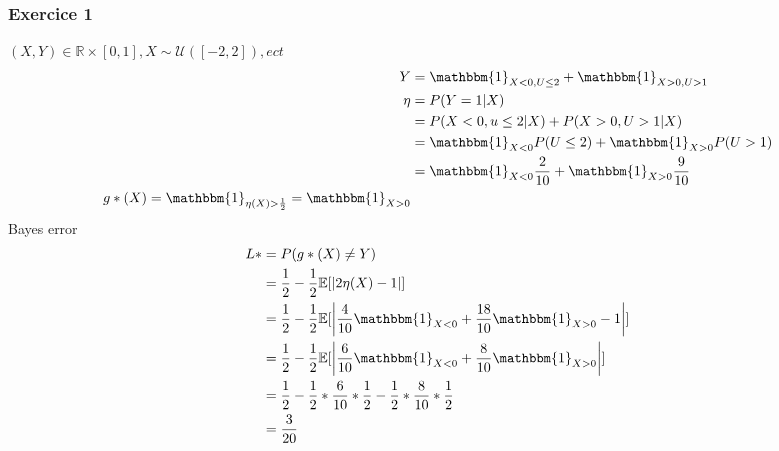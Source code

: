 \documentclass{article}
\theoremstyle{plain}%
\theoremstyle{definition}
\theoremstyle{remark}
\begin{document}
\subsubsection{Exercice 1}
$ (X,Y) \in \mathbb{R}\times [0,1], X \sim \mathcal{U}([-2, 2]), ect $ 
\begin{align*}
    Y &= \mathbbm{1}_{X< 0, U \leq 2} + \mathbbm{1}_{X > 0, U >1} \\
    \eta &= P(Y=1 | X) \\
        &= P(X < 0, u \leq 2 | X) + P(X > 0, U > 1 | X) \\
        &= \mathbbm{1}_{X < 0} P(U \leq 2) + \mathbbm{1}_{X > 0} P(U > 1) \\
        &= \mathbbm{1}_{X < 0} \frac{2}{10} + \mathbbm{1}_{X > 0} \frac{9}{10} \\
        g*(X) = \mathbbm{1}_{\eta (X) >\frac{1}{2}} = \mathbbm{1}_{X > 0}
\end{align*}
Bayes error 
\begin{align*}
    L* &= P(g*(X) \neq Y) \\
        &= \frac{1}{2} - \frac{1}{2} \mathbb{E}[\left| 2 \eta (X) - 1 \right| ] \\
        &= \frac{1}{2} - \frac{1}{2} \mathbb{E}[\left| \frac{4}{10} \mathbbm{1}_{X < 0} + \frac{18}{10} \mathbbm{1}_{X > 0} - 1 \right| ] \\
        &= \frac{1}{2} - \frac{1}{2} \mathbb{E}[\left| \frac{6}{10} \mathbbm{1}_{X < 0} + \frac{8}{10} \mathbbm{1}_{X > 0} \right| ] \\
        &= \frac{1}{2} - \frac{1}{2}* \frac{6}{10} * \frac{1}{2} - \frac{1}{2}* \frac{8}{10} * \frac{1}{2} \\
        &= \frac{3}{20}
\end{align*}
\end{document}
